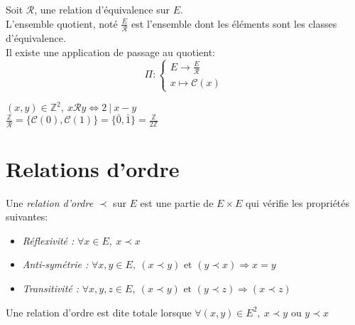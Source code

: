 \documentclass[../main.tex]{subfile}
\begin{document}
\begin{defi}
	Soit $\mathcal{R}$, une relation d'équivalence sur $E$.\\
	L'ensemble quotient, noté $\frac{E}{\mathcal{R}}$ est l'ensemble dont les éléments sont les classes d'équivalence.\\
	Il existe une application de passage au quotient:
	$$\Pi : \left\{
		\begin{array}{l}
			E \to \frac{E}{\mathcal{R}}\\
			x \mapsto \mathcal{C}(x)
		\end{array}
		\right .$$
\end{defi}

\begin{ex}
	$(x, y) \in \mathbb{Z}^2, \ x \mathcal{R} y \Leftrightarrow 2 \ | \ x -y$\\
	$\frac{\mathbb{Z}}{\mathcal{R}} = \{\mathcal{C}(0), \mathcal{C}(1)\} = \{\bar{0}, \bar{1}\} = \frac{\mathbb{Z}}{2 \mathbb{Z}}$
\end{ex}

\section{Relations d'ordre}

\begin{defi}
	Une \emph{relation d'ordre} $\prec$ sur $E$ est une partie de $E \times E$ qui vérifie les propriétés suivantes:
	\begin{itemize}
		\item \emph{Réflexivité :} $\forall x \in E, \ x \prec x$
		\item \emph{Anti-symétrie :} $\forall x, y \in E, \ (x \prec y) \text{ et } (y \prec x) \Rightarrow x = y$
		\item \emph{Transitivité :} $\forall x, y, z \in E, \ (x \prec y) \text{ et } (y \prec z) \Rightarrow (x \prec z)$
	\end{itemize}
\end{defi}

\begin{defi}
	Une relation d'ordre est dite totale lorsque $\forall (x, y) \in E^2, \ x \prec y \text{ ou } y \prec x$
\end{defi}
\end{document}
